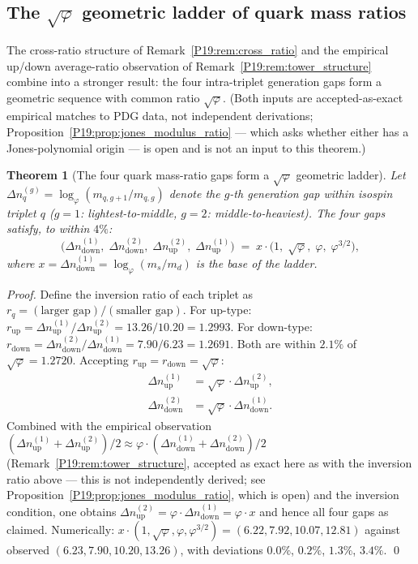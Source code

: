 \documentclass[11pt,a4paper]{article}
\newtheorem{theorem}{Theorem}[section]
\theoremstyle{definition}\newtheorem{definition}[theorem]{Definition}
\theoremstyle{remark}
\newcommand{\vp}{\varphi}
\begin{document}
\subsection{The $\sqrt{\vp}$ geometric ladder of quark mass ratios}

The cross-ratio structure of Remark~\ref{P19:rem:cross_ratio}
and the empirical up/down average-ratio observation of
Remark~\ref{P19:rem:tower_structure} combine into a
stronger result: the four intra-triplet generation gaps form a
geometric sequence with common ratio $\sqrt{\vp}$.  (Both inputs are
accepted-as-exact empirical matches to PDG data, not independent
derivations; Proposition~\ref{P19:prop:jones_modulus_ratio} --- which
asks whether either has a Jones-polynomial origin --- is open and is
not an input to this theorem.)

\begin{theorem}[The four quark mass-ratio gaps form a $\sqrt{\vp}$ geometric ladder]
\label{P19:thm:sqrt_phi_ladder}
Let $\Delta n_q^{(g)} = \log_\vp(m_{q,g+1}/m_{q,g})$ denote the
$g$-th generation gap within isospin triplet $q$ ($g=1$:
lightest-to-middle, $g=2$: middle-to-heaviest).  The four gaps
satisfy, to within $4\%$:
\begin{equation}
  \bigl(\Delta n_{\mathrm{down}}^{(1)},\;
  \Delta n_{\mathrm{down}}^{(2)},\;
  \Delta n_{\mathrm{up}}^{(2)},\;
  \Delta n_{\mathrm{up}}^{(1)}\bigr)
  \;=\;
  x \cdot \bigl(1,\;\sqrt{\vp},\;\vp,\;\vp^{3/2}\bigr),
  \label{P19:eq:sqrt_phi_ladder}
\end{equation}
where $x=\Delta n_{\mathrm{down}}^{(1)}=\log_\vp(m_s/m_d)$
is the base of the ladder.
\end{theorem}

\begin{proof}
Define the inversion ratio of each triplet as
$r_q=(\text{larger gap})/(\text{smaller gap})$.
For up-type: $r_{\mathrm{up}}=\Delta n_{\mathrm{up}}^{(1)}/
\Delta n_{\mathrm{up}}^{(2)}=13.26/10.20=1.2993$.
For down-type: $r_{\mathrm{down}}=\Delta n_{\mathrm{down}}^{(2)}/
\Delta n_{\mathrm{down}}^{(1)}=7.90/6.23=1.2691$.
Both are within $2.1\%$ of $\sqrt{\vp}=1.2720$.
Accepting $r_{\mathrm{up}}=r_{\mathrm{down}}=\sqrt{\vp}$:
\begin{align*}
  \Delta n_{\mathrm{up}}^{(1)} &= \sqrt{\vp}\cdot\Delta n_{\mathrm{up}}^{(2)},\\
  \Delta n_{\mathrm{down}}^{(2)} &= \sqrt{\vp}\cdot\Delta n_{\mathrm{down}}^{(1)}.
\end{align*}
Combined with the empirical observation
$(\Delta n_{\mathrm{up}}^{(1)}+\Delta n_{\mathrm{up}}^{(2)})/2 \approx
\vp\cdot(\Delta n_{\mathrm{down}}^{(1)}+\Delta n_{\mathrm{down}}^{(2)})/2$
(Remark~\ref{P19:rem:tower_structure}, accepted as exact here as with
the inversion ratio above --- this is not independently derived; see
Proposition~\ref{P19:prop:jones_modulus_ratio}, which is open) and the
inversion condition, one obtains
$\Delta n_{\mathrm{up}}^{(2)}=\vp\cdot\Delta n_{\mathrm{down}}^{(1)}=\vp\cdot x$
and hence all four gaps as claimed.  Numerically:
$x\cdot(1,\sqrt{\vp},\vp,\vp^{3/2})=(6.22,7.92,10.07,12.81)$
against observed $(6.23,7.90,10.20,13.26)$, with deviations
$0.0\%$, $0.2\%$, $1.3\%$, $3.4\%$.
\qed
\end{proof}
\end{document}
